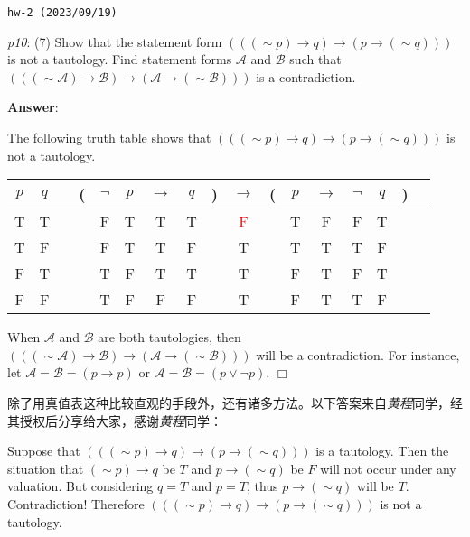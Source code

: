 \documentclass[UTF8,12pt,a4paper]{ctexart}
\newcommand{\negs}{\sim\!}
\begin{document}
\noindent\texttt{hw-2 (2023/09/19)}

\emph{p10}: (7) \quad
Show that the statement form $(((\negs p) \to q)  \to (p \to (\negs q)))$ 
is not a tautology. Find statement forms $\mathscr{A}$ and $\mathscr{B}$ such that 
$(((\negs \mathscr{A}) \to \mathscr{B})  \to (\mathscr{A} \to (\negs \mathscr{B})))$ is a contradiction.

\noindent\textbf{Answer}:

The following truth table shows that $(((\negs p) \to q)  \to (p \to (\negs q)))$ 
is not a tautology.
\begin{center}
	\hspace{8em} 
	\begin{tabular}{@{ }c@{ }@{ }c | c@{ }@{}c@{}@{ }c@{ }@{ }c@{ }@{ }c@{ }@{ }c@{ }@{}c@{}@{ }c@{ }@{}c@{}@{ }c@{ }@{ }c@{ }@{ }c@{ }@{ }c@{ }@{}c@{}@{ }c}
		$p$ & $q$ &  & ( & $\lnot$ & $p$ & $\rightarrow$ & $q$ & ) & $\rightarrow$ & ( & $p$ & $\rightarrow$ & $\lnot$ & $q$ & ) & \\
		\hline 
		T & T &  &  & F & T & T & T &  & \textcolor{red}{F} &  & T & F & F & T &  & \\
		T & F &  &  & F & T & T & F &  & {T} &  & T & T & T & F &  & \\
		F & T &  &  & T & F & T & T &  & {T} &  & F & T & F & T &  & \\
		F & F &  &  & T & F & F & F &  & {T} &  & F & T & T & F &  & \\
	\end{tabular}
\end{center}

When  $\mathscr{A}$ and $\mathscr{B}$  are both tautologies, 
then $(((\negs \mathscr{A}) \to \mathscr{B})  \to (\mathscr{A} \to (\negs \mathscr{B})))$ will be a contradiction. 
For instance, let $\mathscr{A} = \mathscr{B} = (p \to p)$ or 
$\mathscr{A} = \mathscr{B} = (p \lor  \neg p)$.
\hfill $\Box$


\vspace{1em}
除了用真值表这种比较直观的手段外，还有诸多方法。以下答案来自\textit{黄程}同学，经其授权后分享给大家，感谢\textit{黄程}同学\faThumbsUp ：

Suppose that $(((\negs p) \to q)  \to (p \to (\negs q)))$  is a tautology. Then the situation that $(\negs p) \to q $ be $T$ and $p \to (\negs q)$ be $F$ will not occur under any valuation. 
But considering $q = T$ and $p = T$,  thus $p \to (\negs q)$ will be $T$. Contradiction! 
Therefore $(((\negs p) \to q)  \to (p \to (\negs q)))$  is not a tautology.
\end{document}
